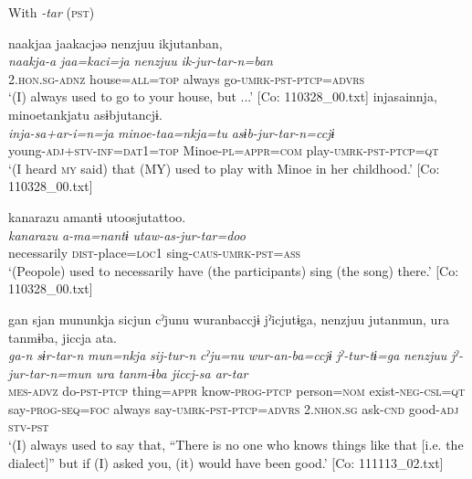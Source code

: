   With \textit{-tar} (\textsc{pst})

\ea
{\TM}
\glll  naakjaa  jaakacjəə  {\textbar}nenzjuu{\textbar}  ikjutanban,\\
\textit{naakja-a}  \textit{jaa=kaci=ja}  \textit{nenzjuu}  \textit{ik-jur-tar-n=ban}\\
2.\textsc{hon}.\textsc{sg}-\textsc{adnz}  house=\textsc{all}=\textsc{top}  always  go-\textsc{umrk}-\textsc{pst}-\textsc{ptcp}=\textsc{advrs}\\
\glt ‘(I) always used to go to your house, but ...’ [Co: 110328\_00.txt]
\ex
{\TM}
\glll  injasainnja,  minoetankjatu      asɨbjutancjɨ.\\
\textit{inja-sa+ar-i=n=ja}  \textit{minoe-taa=nkja=tu}      \textit{asɨb-jur-tar-n=ccjɨ}\\
young-\textsc{adj}+\textsc{stv}-\textsc{inf}=\textsc{dat1}=\textsc{top}  Minoe-\textsc{pl}=\textsc{appr}=\textsc{com} play-\textsc{umrk}-\textsc{pst}-\textsc{ptcp}=\textsc{qt}\\
\glt ‘(I heard \textsc{my} said) that (MY) used to play with Minoe in her childhood.’ [Co: 110328\_00.txt]

\ex
{\TM}
\glll  {\textbar}kanarazu{\textbar}  amantɨ  utoosjutattoo.\\
\textit{kanarazu}  \textit{a-ma=nantɨ}  \textit{utaw-as-jur-tar=doo}\\
necessarily  \textsc{dist}-place=\textsc{loc1}  sing-\textsc{caus}-\textsc{umrk}-\textsc{pst}=\textsc{ass}\\
\glt ‘(Peopole) used to necessarily have (the participants) sing (the song) there.’ [Co: 110328\_00.txt]

\ex
{\TM}
\glll  gan  sjan  mununkja  sicjun{\footnotemark}   cˀjunu  wuranbaccjɨ  jˀicjutɨga,  {\textbar}nenzjuu{\textbar}      jutanmun,  ura  tanmɨba,  jiccja  ata.\\
\textit{ga-n}  \textit{sɨr-tar-n}  \textit{mun=nkja}  \textit{sij-tur-n}     \textit{cˀju=nu}  \textit{wur-an-ba=ccjɨ}  \textit{jˀ-tur-tɨ=ga}  \textit{nenzjuu}      \textit{jˀ-jur-tar-n=mun  ura  tanm-ɨba  jiccj-sa  ar-tar}\\
\textsc{mes}-\textsc{advz}  do-\textsc{pst}-\textsc{ptcp}  thing=\textsc{appr}  know-\textsc{prog}-\textsc{ptcp}  person=\textsc{nom}  exist-\textsc{neg}-\textsc{csl}=\textsc{qt}  say-\textsc{prog}-\textsc{seq}=\textsc{foc}  always  say-\textsc{umrk}-\textsc{pst}-\textsc{ptcp}=\textsc{advrs}  2.\textsc{nhon}.\textsc{sg}  ask-\textsc{cnd}  good-\textsc{adj}  \textsc{stv}-\textsc{pst}\\
\glt ‘(I) always used to say that, “There is no one who knows things like that [i.e. the dialect]” but if (I) asked you, (it) would have been good.’ [Co: 111113\_02.txt]

